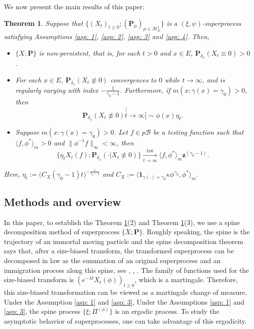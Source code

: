 \documentclass[12pt, a4paper]{amsart}
\newtheorem{thm}{Theorem}[section]
\theoremstyle{definition}
\numberwithin{equation}{section}
\begin{document}
	We now present the main results of this paper:

\begin{thm}
\label{thm: main theorem}
	Suppose that $\{(X_t)_{t\geq 0}; (\mathbf P_\mu)_{\mu \in \mathcal M_E^1}\}$ is a $(\xi, \psi)$-superprocess satisfying Assumptions \ref{asp: 1}, \ref{asp: 2}, \ref{asp: 3} and \ref{asp: 4}. Then,
\begin{itemize}
	\item[(1)] $\{X; \mathbf P\}$ is non-persistent, that is, for each $t > 0$ and $x\in E$, $\mathbf P_{\delta_x}(X_t \equiv 0) > 0$.
	\item[(2)] For each $x\in E$, $\mathbf P_{\delta_x}(X_t \not \equiv 0)$ convergences to $0$ while $t\to \infty$, and is regularly varying with index $-\frac{1}{\gamma_0-1}$.
	Furthermore, if $m(x: \gamma (x)= \gamma_0)>0$, then
\[
	\mathbf P_{\delta_x}(X_t \not \equiv 0)
	\stackrel[t\to \infty]{}{\sim} \phi(x)\eta_t.
\]
	\item[(3)] Suppose $m( x:\gamma(x)=\gamma_0 )>0$.
	Let $f \in p\mathscr B$ be a testing function such that $\langle f, \phi^* \rangle_m > 0$  and $\| \phi^{-1}f \|_\infty < \infty$, then
\[
	\{   \eta_t X_t(f) ; \mathbf P_{\delta_x}(\cdot | X_t \not \equiv 0) \}
	\xrightarrow[t\to \infty]{\operatorname{law}}
	\langle f, \phi^*\rangle_m \mathbf z^{(\gamma_0 - 1)}.
\]
\end{itemize}
	Here, $\eta_t := \big( C_X(\gamma_0 - 1) t \big)^{- \frac {1} {\gamma_0 - 1} }$ and $C_X := \langle \mathbf 1_{\gamma(\cdot) = \gamma_0} \kappa \phi^{\gamma_0}, \phi^* \rangle_m$.
\end{thm}

\subsection{Methods and overview}
	
	In this paper, to establish the Theorem \ref{thm: main theorem}(2) and Theorem \ref{thm: main theorem}(3), we use a spine decomposition method of superprocess $\{X; \mathbf P\}$.
	Roughly speaking, the spine is the trajectory of an immortal moving particle and the spine decomposition theorem says that, after a size-biased transform, the transformed superprocess can be decomposed in law as the summation of an original superprocess and an immigration process along this spine, see \cite{EckhoffKyprianouWinkel2015Spines}, \cite{EnglanderKyprianou2004Local}, \cite{LiuRenSong2009Llog}.
	The family of functions used for the size-biased transform is $(e^{-\lambda t} X_t(\phi))_{t\geq 0}$, which is a martingale.
	Therefore, this size-biased transformation can be viewed as a martingale change of measure.
	Under the Assumption \ref{asp: 1} and \ref{asp: 3}, 
	Under the Assumptions \ref{asp: 1} and \ref{asp: 3}, 
	the spine process $\{\xi; \Pi^{(\phi)}\}$ is an ergodic process.
	To study the asymptotic behavior of superprocesses, one can take advantage of this ergodicity.
	
\end{document}
